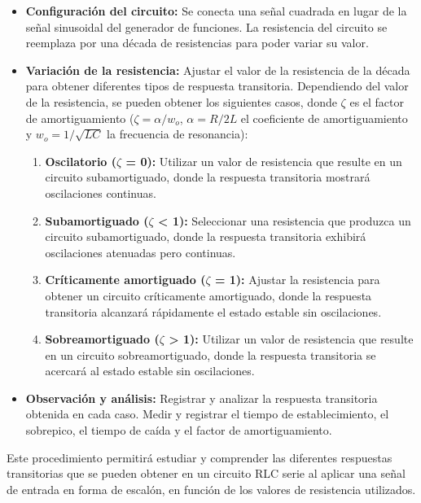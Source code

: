 \documentclass[12pt]{article}
\begin{document}
    \begin{itemize}
        \item \textbf{Configuración del circuito:} Se conecta una señal cuadrada en lugar de la señal sinusoidal del generador de funciones. La resistencia del circuito se reemplaza por una década de resistencias para poder variar su valor.
        
        \item \textbf{Variación de la resistencia:} Ajustar el valor de la resistencia de la década para obtener diferentes tipos de respuesta transitoria. Dependiendo del valor de la resistencia, se pueden obtener los siguientes casos, donde $\zeta$ es el factor de amortiguamiento ($\zeta = \alpha/w_{o}$, $\alpha = R/2L$ el coeficiente de amortiguamiento y $w_{o} = 1/\sqrt{LC}$ la frecuencia de resonancia):
        
        \begin{enumerate}
        	\item \textbf{Oscilatorio ($\zeta$ = 0):} Utilizar un valor de resistencia que resulte en un circuito subamortiguado, donde la respuesta transitoria mostrará oscilaciones continuas.
        	
        	\item \textbf{Subamortiguado ($\zeta$ < 1):} Seleccionar una resistencia que produzca un circuito subamortiguado, donde la respuesta transitoria exhibirá oscilaciones atenuadas pero continuas.
        	
        	\item \textbf{Críticamente amortiguado ($\zeta$ = 1):} Ajustar la resistencia para obtener un circuito críticamente amortiguado, donde la respuesta transitoria alcanzará rápidamente el estado estable sin oscilaciones.
        	
        	\item \textbf{Sobreamortiguado ($\zeta$ > 1):} Utilizar un valor de resistencia que resulte en un circuito sobreamortiguado, donde la respuesta transitoria se acercará al estado estable sin oscilaciones.
        \end{enumerate}
        
        \item \textbf{Observación y análisis:} Registrar y analizar la respuesta transitoria obtenida en cada caso. Medir y registrar el tiempo de establecimiento, el sobrepico, el tiempo de caída y el factor de amortiguamiento.
    \end{itemize}
	
	Este procedimiento permitirá estudiar y comprender las diferentes respuestas transitorias que se pueden obtener en un circuito RLC serie al aplicar una señal de entrada en forma de escalón, en función de los valores de resistencia utilizados.
    
\end{document}
